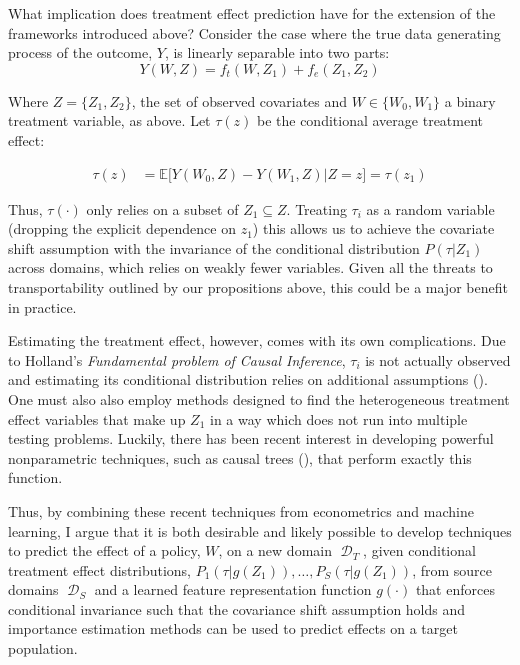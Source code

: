 \documentclass[a4paper,12pt]{article}
\DeclareMathOperator*{\D}{\mathcal{D}}
\begin{document}
What implication does treatment effect prediction have for the extension of the frameworks introduced above? Consider the case where the true data generating process of the outcome, $Y$, is linearly separable into two parts:
%
$$
Y(W,Z) = f_t(W,Z_1) + f_e(Z_1, Z_2)
$$

Where $Z = \{ Z_1, Z_2 \}$, the set of observed covariates and $W \in \{ W_0, W_1 \}$ a binary treatment variable, as above. Let $\tau(z)$ be the conditional average treatment effect:

\begin{align*}
\tau(z) &= \mathbb{E} \big[ Y(W_0, Z) - Y(W_1, Z) | Z = z \big] = \tau(z_1)
\end{align*}

Thus, $\tau(\cdot)$ only relies on a subset of $Z_1 \subseteq Z$. Treating $\tau_i$ as a random variable (dropping the explicit dependence on $z_1$) this allows us to achieve the covariate shift assumption with the invariance of the conditional distribution $P(\tau | Z_1)$ across domains, which relies on weakly fewer variables. Given all the threats to transportability outlined by our propositions above, this could be a major benefit in practice.

Estimating the treatment effect, however, comes with its own complications. Due to Holland's \parencite*{Holland1986} \textit{Fundamental problem of Causal Inference}, $\tau_i$ is not actually observed and estimating its conditional distribution relies on additional assumptions (\cite{Firpo2007}). One must also also employ methods designed to find the heterogeneous treatment effect variables that make up $Z_1$ in a way which does not run into multiple testing problems. Luckily, there has been recent interest in developing powerful nonparametric techniques, such as causal trees (\cite{Athey2016}), that perform exactly this function.

Thus, by combining these recent techniques from econometrics and machine learning, I argue that it is both desirable and likely possible to develop techniques to predict the effect of a policy, $W$, on a new domain $\D_T$, given conditional treatment effect distributions, $P_1(\tau | g(Z_1)),\ldots, P_S(\tau | g(Z_1))$, from source domains $\D_S$ and a learned feature representation function $g(\cdot)$ that enforces conditional invariance such that the covariance shift assumption holds and importance estimation methods can be used to predict effects on a target population.

\newcommand{\TTs}{\hat{\tau}(x_i, \Pi, S(\mathcal{D}_S))}
\newcommand{\TTt}{\hat{\tau}(x_i, \Pi, S(\mathcal{D}_T))}
\newcommand{\TT}{\tau(X, \Pi)}
\newcommand{\Ex}{\mathbb{E}}
\end{document}
